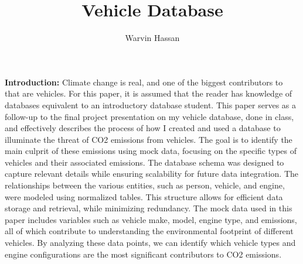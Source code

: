 \documentclass[12pt,letterpaper]{article}
\title{Vehicle Database}
\author{Warvin Hassan}
\begin{document}
	\maketitle
	\pagebreak
	\textbf{Introduction:}
	Climate change is real, and one of the biggest contributors to that are vehicles. For this paper, it is assumed that the reader has knowledge of databases equivalent to an introductory database student. This paper serves as a follow-up to the final project presentation on my vehicle database, done in class, and effectively describes the process of how I created and used a database to illuminate the threat of CO2 emissions from vehicles. The goal is to identify the main culprit of these emissions using mock data, focusing on the specific types of vehicles and their associated emissions. The database schema was designed to capture relevant details while ensuring scalability for future data integration. The relationships between the various entities, such as person, vehicle, and engine, were modeled using normalized tables. This structure allows for efficient data storage and retrieval, while minimizing redundancy. The mock data used in this paper includes variables such as vehicle make, model, engine type, and emissions, all of which contribute to understanding the environmental footprint of different vehicles. By analyzing these data points, we can identify which vehicle types and engine configurations are the most significant contributors to CO2 emissions. 
	
\end{document}
